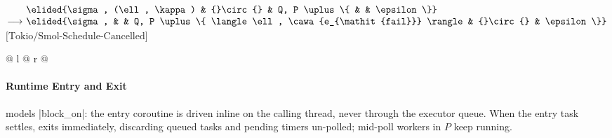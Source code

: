 \vspace{1em}
\noindent
$\begin{array}[t]{@{}r@{\ }l@{}l@{}l@{}l@{}l@{}}
                & \elided{\sigma, (\ell, \kappa) & {}\circ{} & Q, P \uplus \{ & & \epsilon \}} \\
\longrightarrow & \elided{\sigma,                &           & Q, P \uplus \{ \langle \ell, \cawa{e_{\mathit{fail}}} \rangle & {}\circ{} & \epsilon \}}
\end{array}$\hfill$\text{[Tokio/Smol-Schedule-Cancelled]}$\par
\noindent
\begin{tabular*}{\linewidth}{@{} l @{\extracolsep{\fill}} r @{}}
\end{tabular*}
\vspace{0.7em}

\paragraph{Runtime Entry and Exit}
 models \code|block_on|: the entry coroutine is driven inline on the calling thread, never through the executor queue. When the entry task settles,  exits immediately, discarding queued tasks and pending timers un-polled; mid-poll workers in $P$ keep running.

